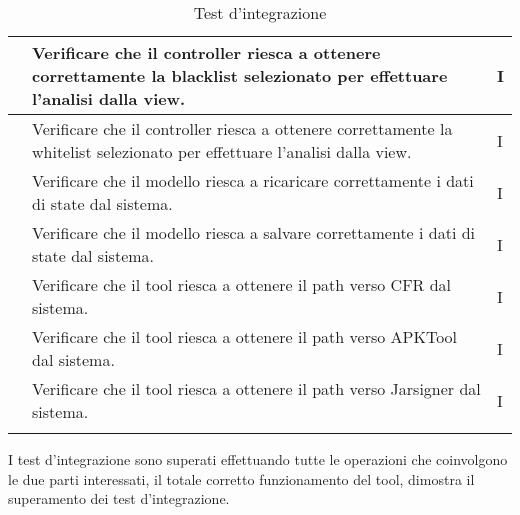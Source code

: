 \begin{center}
\begin{longtable}{ |C{3cm} | C{8.5cm}| C{1.5cm} |}
         &Verificare che il controller riesca a ottenere correttamente la blacklist selezionato per effettuare l'analisi dalla view.& I \\\hline
         &Verificare che il controller riesca a ottenere correttamente la whitelist selezionato per effettuare l'analisi dalla view.& I \\\hline
         &Verificare che il modello riesca a ricaricare correttamente i dati di state dal sistema.& I \\\hline
         &Verificare che il modello riesca a salvare correttamente i dati di state dal sistema.& I \\\hline
         &Verificare che il tool riesca a ottenere il path verso CFR dal sistema.& I \\\hline
         &Verificare che il tool riesca a ottenere il path verso APKTool dal sistema.& I \\\hline
         &Verificare che il tool riesca a ottenere il path verso Jarsigner dal sistema.& I \\\hline
        \caption{Test d'integrazione}
    \end{longtable}
\end{center}
\setcounter{rowcount}{0}
I test d'integrazione sono superati effettuando tutte le operazioni che coinvolgono le due parti interessati, il totale corretto funzionamento del tool, dimostra il superamento dei test d'integrazione.

